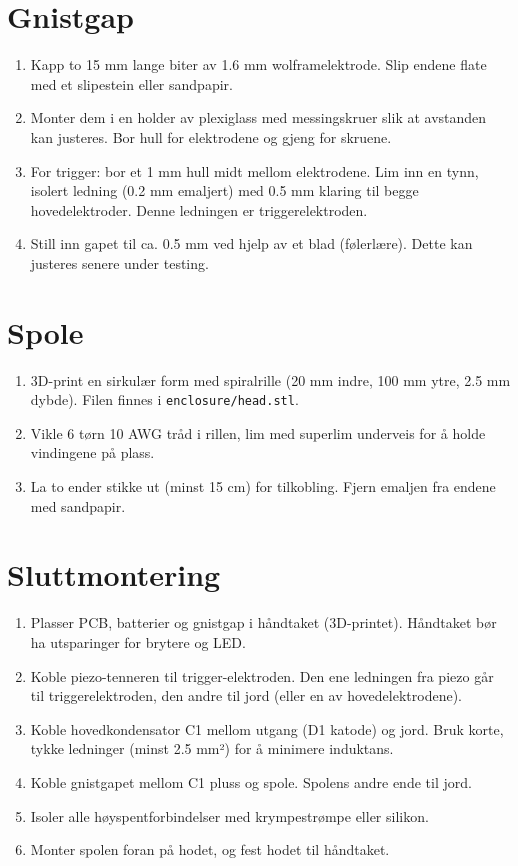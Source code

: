 \documentclass{article}
\begin{document}
\section{Gnistgap}
\begin{enumerate}
\item Kapp to 15 mm lange biter av 1.6 mm wolframelektrode. Slip endene flate med et slipestein eller sandpapir.
\item Monter dem i en holder av plexiglass med messingskruer slik at avstanden kan justeres. Bor hull for elektrodene og gjeng for skruene.
\item For trigger: bor et 1 mm hull midt mellom elektrodene. Lim inn en tynn, isolert ledning (0.2 mm emaljert) med 0.5 mm klaring til begge hovedelektroder. Denne ledningen er triggerelektroden.
\item Still inn gapet til ca. 0.5 mm ved hjelp av et blad (følerlære). Dette kan justeres senere under testing.
\end{enumerate}

\section{Spole}
\begin{enumerate}
\item 3D-print en sirkulær form med spiralrille (20 mm indre, 100 mm ytre, 2.5 mm dybde). Filen finnes i \texttt{enclosure/head.stl}.
\item Vikle 6 tørn 10 AWG tråd i rillen, lim med superlim underveis for å holde vindingene på plass.
\item La to ender stikke ut (minst 15 cm) for tilkobling. Fjern emaljen fra endene med sandpapir.
\end{enumerate}

\section{Sluttmontering}
\begin{enumerate}
\item Plasser PCB, batterier og gnistgap i håndtaket (3D-printet). Håndtaket bør ha utsparinger for brytere og LED.
\item Koble piezo-tenneren til trigger-elektroden. Den ene ledningen fra piezo går til triggerelektroden, den andre til jord (eller en av hovedelektrodene).
\item Koble hovedkondensator C1 mellom utgang (D1 katode) og jord. Bruk korte, tykke ledninger (minst 2.5 mm²) for å minimere induktans.
\item Koble gnistgapet mellom C1 pluss og spole. Spolens andre ende til jord.
\item Isoler alle høyspentforbindelser med krympestrømpe eller silikon.
\item Monter spolen foran på hodet, og fest hodet til håndtaket.
\end{enumerate}
\end{document}
